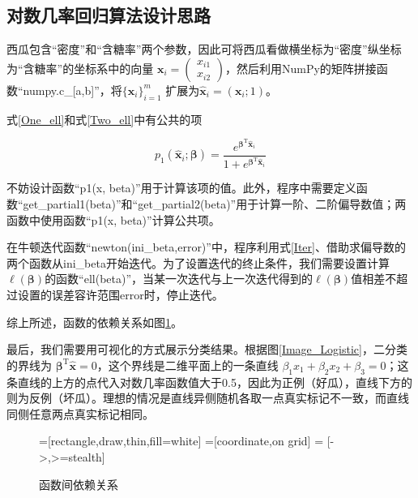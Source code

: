\documentclass{ctexart}
\begin{document}
	\subsection{对数几率回归算法设计思路}
	西瓜包含“密度”和“含糖率”两个参数，因此可将西瓜看做横坐标为“密度”纵坐标为“含糖率”的坐标系中的向量 $\bm{x}_i=\begin{pmatrix}x_{i1}\\x_{i2}\end{pmatrix}$，然后利用NumPy的矩阵拼接函数“numpy.c\_[a,b]”，将$\{\bm{x}_i\}_{i=1}^m$ 扩展为$\hat{\bm{x}}_i=(\bm{x}_i;1)$。
	
	式\eqref{One_ell}和式\eqref{Two_ell}中有公共的项
	
	\begin{equation}
		p_1(\hat{\bm{x}}_i;\bm{\beta})=\frac{e^{\bm{\beta}^\mathrm{T}\hat{\bm{x}}_i}}{1+e^{\bm{\beta}^\mathrm{T}\hat{\bm{x}}_i}}
		\label{P1}
	\end{equation}
	
	不妨设计函数“p1(x, beta)”用于计算该项的值。此外，程序中需要定义函数“get\_partial1(beta)”和“get\_partial2(beta)”用于计算一阶、二阶偏导数值；两函数中使用函数“p1(x, beta)”计算公共项。
	
	在牛顿迭代函数“newton(ini\_beta,error)”中，程序利用式\eqref{Iter}、借助求偏导数的两个函数从ini\_beta开始迭代。为了设置迭代的终止条件，我们需要设置计算$\ell(\bm{\beta})$的函数“ell(beta)”，当某一次迭代与上一次迭代得到的$\ell(\bm{\beta})$值相差不超过设置的误差容许范围error时，停止迭代。
	
	综上所述，函数的依赖关系如图\ref{Dependency}。
	
	最后，我们需要用可视化的方式展示分类结果。根据图\ref{Image_Logistic}，二分类的界线为 $\bm{\beta}^\mathrm{T}\hat{\bm{x}}=0$，这个界线是二维平面上的一条直线 $\beta_1x_1+\beta_2x_2+\beta_3=0$；这条直线的上方的点代入对数几率函数值大于0.5，因此为正例（好瓜），直线下方的则为反例（坏瓜）。理想的情况是直线异侧随机各取一点真实标记不一致，而直线同侧任意两点真实标记相同。
	
	\begin{figure}[htb]
		\centering
		\scriptsize
		=[rectangle,draw,thin,fill=white]
		=[coordinate,on grid]
		 = [->,>=stealth]
		\caption{函数间依赖关系}
		\label{Dependency}
	\end{figure}
	
\end{document}
